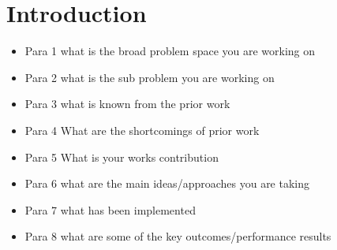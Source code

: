 \section{Introduction}%

\begin{itemize}
  \item Para 1 what is the broad problem space you are working on
  \item Para 2 what is the sub problem you are working on
  \item Para 3 what is known from the prior work
  \item Para 4 What are the shortcomings of prior work
  \item Para 5 What is your works contribution
  \item Para 6 what are the main ideas/approaches you are taking
  \item Para 7 what has been implemented
  \item Para 8 what are some of the key outcomes/performance results
\end{itemize}
